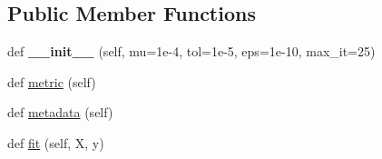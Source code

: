\subsection*{Public Member Functions}
\begin{DoxyCompactItemize}
\item 
def {\bfseries \+\_\+\+\_\+init\+\_\+\+\_\+} (self, mu=1e-\/4, tol=1e-\/5, eps=1e-\/10, max\+\_\+it=25)\hypertarget{classdml_1_1dml__eig_1_1DML__eig_a4571866c0c415246ba21a38e30367a6c}{}\label{classdml_1_1dml__eig_1_1DML__eig_a4571866c0c415246ba21a38e30367a6c}

\item 
def \hyperlink{classdml_1_1dml__eig_1_1DML__eig_af082539ea8c8d03f1115bfd21f73cd03}{metric} (self)
\item 
def \hyperlink{classdml_1_1dml__eig_1_1DML__eig_a59cfd79003d7a00ecfe3fbbf000bccf3}{metadata} (self)
\item 
def \hyperlink{classdml_1_1dml__eig_1_1DML__eig_a63a5d0661b8bc3a0dab73acb01df21ad}{fit} (self, X, y)
\end{DoxyCompactItemize}
